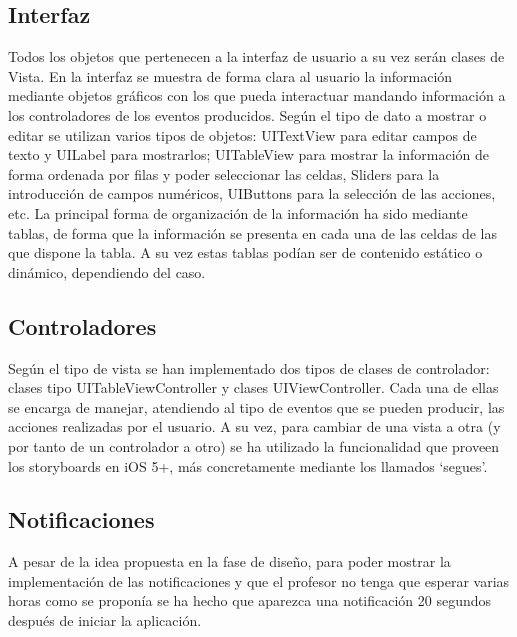 \documentclass[parskip=half*]{scrartcl}
\begin{document}
\subsection{Interfaz}

Todos los objetos que pertenecen a la interfaz de usuario a su vez serán clases de Vista. En la interfaz se muestra de forma clara al usuario la información mediante objetos gráficos con los que pueda interactuar mandando información a los controladores de los eventos producidos. Según el tipo de dato a mostrar o editar se utilizan varios tipos de objetos: UITextView para editar campos de texto y UILabel para mostrarlos; UITableView para mostrar la información de forma ordenada por filas y poder seleccionar las celdas, Sliders para la introducción de campos numéricos, UIButtons para la selección de las acciones, etc. La principal forma de organización de la información ha sido mediante tablas, de forma que la información se presenta en cada una de las celdas de las que dispone la tabla. A su vez estas tablas podían ser de contenido estático o dinámico, dependiendo del caso.

\subsection{Controladores}

Según el tipo de vista se han implementado dos tipos de clases de controlador: clases tipo UITableViewController y clases UIViewController. Cada una de ellas se encarga de manejar, atendiendo al tipo de eventos que se pueden producir, las acciones realizadas por el usuario. A su vez, para cambiar de una vista a otra (y por tanto de un controlador a otro) se ha utilizado la funcionalidad que proveen los storyboards en iOS 5+, más concretamente mediante los llamados `segues'.

\subsection{Notificaciones}

A pesar de la idea propuesta en la fase de dise\~no, para poder mostrar la implementaci\'on de las notificaciones y que el profesor no tenga que esperar varias horas como se propon\'ia se ha hecho que aparezca una notificaci\'on 20 segundos despu\'es de iniciar la aplicaci\'on.
\end{document}
